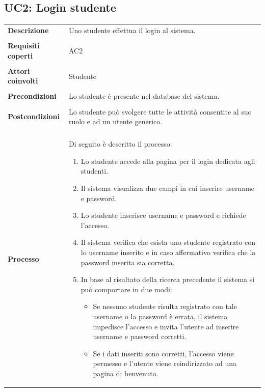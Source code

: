 \documentclass[10pt,a4paper]{article}
\begin{document}
	\subsection{UC2: Login studente}
	\begin{tabular}{lp{}}
		\textbf{Descrizione}&Uno studente effettua il login al sistema.\\
		\\
		\textbf{Requisiti coperti}&AC2\\
		\\
		\textbf{Attori coinvolti}&Studente\\
		\\
		\textbf{Precondizioni}&Lo studente è presente nel database del sistema.\\
		\\
		\textbf{Postcondizioni}&Lo studente può svolgere tutte le attività consentite al suo ruolo e ad un utente generico.\\
		\\
		\textbf{Processo}&Di seguito è descritto il processo:
		\begin{enumerate}
			\item Lo studente accede alla pagina per il login dedicata agli studenti.
			\item Il sistema visualizza due campi in cui inserire username e password.
			\item Lo studente inserisce username e password e richiede l'accesso.
			\item Il sistema verifica che esista uno studente registrato con lo username inserito e in caso affermativo verifica che la password inserita sia corretta.
			\item In base al risultato della ricerca precedente il sistema si può comportare in due modi:
			\begin{itemize}
				\item Se nessuno studente risulta registrato con tale username o la password è errata, il sistema impedisce l'accesso e invita l'utente ad inserire username e password corretti.
				\item Se i dati inseriti sono corretti, l'accesso viene permesso e l'utente viene reindirizzato ad una pagina di benvenuto.
			\end{itemize} 
		\end{enumerate}
	\end{tabular}
\end{document}
